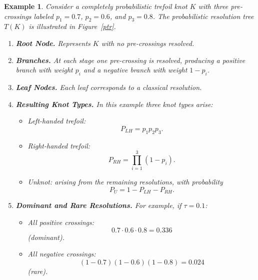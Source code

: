 \documentclass[a4paper, reqno, 12pt]{amsart}
\theoremstyle{plain}
\newtheorem{ex}[theorem]{Example}
\theoremstyle{definition}
\begin{document}
\begin{ex}\rm
Consider a completely probabilistic trefoil knot $K$ with three pre-crossings labeled $p_1=0.7$, $p_2=0.6$, and $p_3=0.8$. The probabilistic resolution tree $T(K)$ is illustrated in Figure~\ref{ptr}.

\begin{enumerate}

\item \textbf{Root Node.}
Represents $K$ with no pre-crossings resolved.

\smallbreak

\item \textbf{Branches.}
At each stage one pre-crossing is resolved, producing a positive branch with weight $p_i$ and a negative branch with weight $1-p_i$.

\smallbreak

\item \textbf{Leaf Nodes.}
Each leaf corresponds to a classical resolution.

\smallbreak

\item \textbf{Resulting Knot Types.}
In this example three knot types arise:

\begin{itemize}

\item Left-handed trefoil:
\[
P_{LH} = p_1 p_2 p_3 .
\]

\item Right-handed trefoil:
\[
P_{RH} =
\prod_{i=1}^{3} (1-p_i).
\]

\item Unknot:
arising from the remaining resolutions, with probability
\[
P_U = 1- P_{LH}- P_{RH}.
\]

\end{itemize}

\smallbreak

\item \textbf{Dominant and Rare Resolutions.}
For example, if $\tau=0.1$:

\begin{itemize}

\item All positive crossings:
\[
0.7 \cdot 0.6 \cdot 0.8 = 0.336
\]
(dominant).

\item All negative crossings:
\[
(1-0.7)(1-0.6)(1-0.8)=0.024
\]
(rare).

\end{itemize}

\end{enumerate}
\end{ex} 
\end{document}
